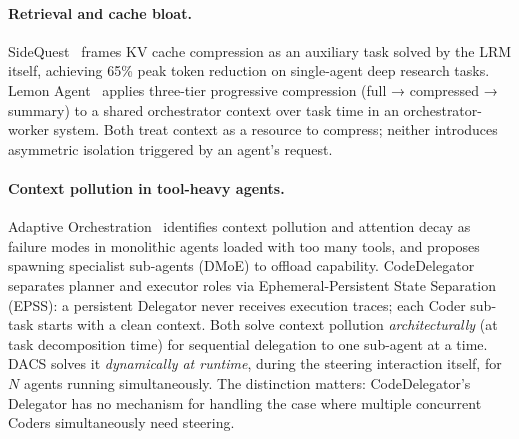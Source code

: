 \documentclass{article}
\begin{document}
\paragraph{Retrieval and cache bloat.}
SideQuest~\citep{sidequest2025} frames KV cache compression as an
auxiliary task solved by the LRM itself, achieving 65\% peak token
reduction on single-agent deep research tasks.
Lemon Agent~\citep{lemon2025} applies three-tier progressive compression
(full → compressed → summary) to a shared orchestrator context over task
time in an orchestrator-worker system.
Both treat context as a resource to compress; neither introduces asymmetric
isolation triggered by an agent's request.

\paragraph{Context pollution in tool-heavy agents.}
Adaptive Orchestration~\citep{adaptorch2025} identifies context pollution
and attention decay as failure modes in monolithic agents loaded with too
many tools, and proposes spawning specialist sub-agents (DMoE) to offload
capability.
CodeDelegator~\citep{codedelegator2025} separates planner and executor
roles via Ephemeral-Persistent State Separation (EPSS): a persistent
Delegator never receives execution traces; each Coder sub-task starts with
a clean context.
Both solve context pollution \emph{architecturally} (at task decomposition
time) for sequential delegation to one sub-agent at a time.
DACS solves it \emph{dynamically at runtime}, during the steering
interaction itself, for $N$ agents running simultaneously.
The distinction matters: CodeDelegator's Delegator has no mechanism for
handling the case where multiple concurrent Coders simultaneously need
steering.
\end{document}
